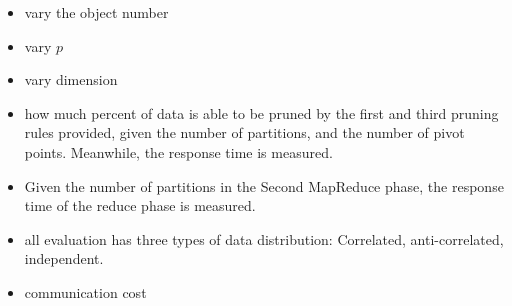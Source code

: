 \begin{itemize}
\item vary the object number

\item vary $p$

\item vary dimension

\item how much percent of data is able to be pruned by the first and third pruning rules provided, given the number of partitions, and the number of pivot points. Meanwhile, the response time is measured.

\item Given the number of partitions in the Second MapReduce phase, the response time of the reduce phase is measured.

\item all evaluation has three types of data distribution: Correlated, anti-correlated, independent.

\item communication cost

\end{itemize}



